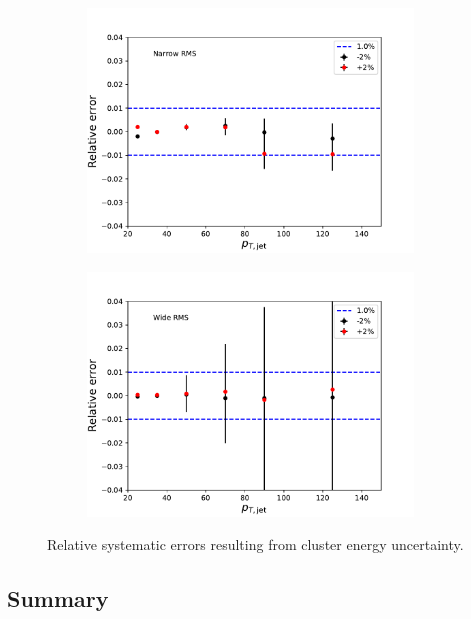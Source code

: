 \begin{figure}
\centering
\begin{subfigure}{0.45\textwidth}
\includegraphics[width=0.95\textwidth]{figures/systematics/SystematicErrorsGausRMS_Emcal.pdf}
\end{subfigure}
\begin{subfigure}{0.45\textwidth}
\includegraphics[width=0.95\textwidth]{figures/systematics/SystematicErrorsGammaRMS_Emcal.pdf}
\end{subfigure}
\caption{Relative systematic errors resulting from cluster energy uncertainty.}
\label{fig:systemcal2}
\end{figure}

  \subsection{Summary}

